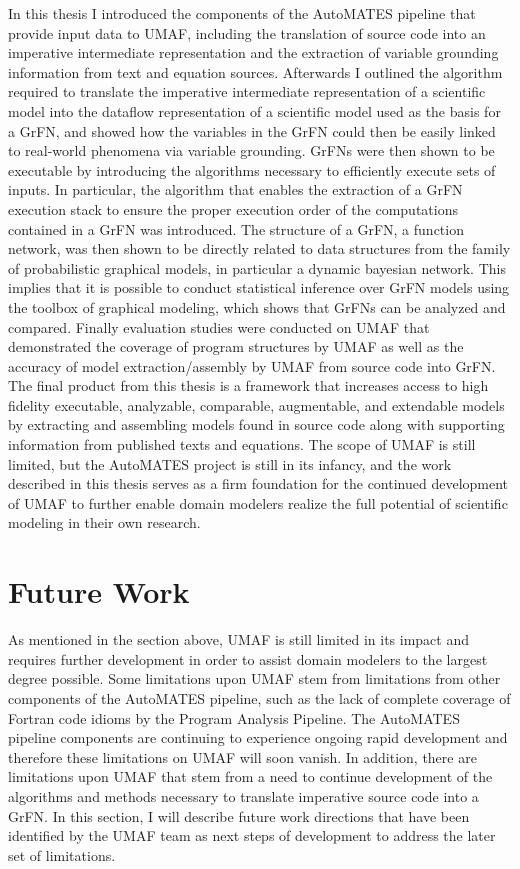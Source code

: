 In this thesis I introduced the components of the AutoMATES pipeline that provide input data to UMAF, including the translation of source code into an imperative intermediate representation and the extraction of variable grounding information from text and equation sources.
Afterwards I outlined the algorithm required to translate the imperative intermediate representation of a scientific model into the dataflow representation of a scientific model used as the basis for a GrFN, and showed how the variables in the GrFN could then be easily linked to real-world phenomena via variable grounding.
GrFNs were then shown to be executable by introducing the algorithms necessary to efficiently execute sets of inputs.
In particular, the algorithm that enables the extraction of a GrFN execution stack to ensure the proper execution order of the computations contained in a GrFN was introduced.
The structure of a GrFN, a function network, was then shown to be directly related to data structures from the family of probabilistic graphical models, in particular a dynamic bayesian network.
This implies that it is possible to conduct statistical inference over GrFN models using the toolbox of graphical modeling, which shows that GrFNs can be analyzed and compared.
Finally evaluation studies were conducted on UMAF that demonstrated the coverage of program structures by UMAF as well as the accuracy of model extraction/assembly by UMAF from source code into GrFN.
The final product from this thesis is a framework that increases access to high fidelity executable, analyzable, comparable, augmentable, and extendable models by extracting and assembling models found in source code along with supporting information from published texts and equations.
The scope of UMAF is still limited, but the AutoMATES project is still in its infancy, and the work described in this thesis serves as a firm foundation for the continued development of UMAF to further enable domain modelers realize the full potential of scientific modeling in their own research.


\section{Future Work\label{sec:future_work}}
As mentioned in the section above, UMAF is still limited in its impact and requires further development in order to assist domain modelers to the largest degree possible.
Some limitations upon UMAF stem from limitations from other components of the AutoMATES pipeline, such as the lack of complete coverage of Fortran code idioms by the Program Analysis Pipeline.
The AutoMATES pipeline components are continuing to experience ongoing rapid development and therefore these limitations on UMAF will soon vanish.
In addition, there are limitations upon UMAF that stem from a need to continue development of the algorithms and methods necessary to translate imperative source code into a GrFN.
In this section, I will describe future work directions that have been identified by the UMAF team as next steps of development to address the later set of limitations.

